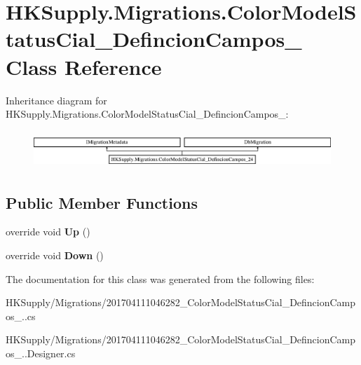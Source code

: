 \hypertarget{class_h_k_supply_1_1_migrations_1_1_color_model_status_cial___defincion_campos__24}{}\section{H\+K\+Supply.\+Migrations.\+Color\+Model\+Status\+Cial\+\_\+\+Defincion\+Campos\+\_ Class Reference}
\label{class_h_k_supply_1_1_migrations_1_1_color_model_status_cial___defincion_campos__24}
Inheritance diagram for H\+K\+Supply.\+Migrations.\+Color\+Model\+Status\+Cial\+\_\+\+Defincion\+Campos\+\_\+:\begin{figure}[H]
\begin{center}
\leavevmode
\includegraphics[height=1.428571cm]{class_h_k_supply_1_1_migrations_1_1_color_model_status_cial___defincion_campos__24}
\end{center}
\end{figure}
\subsection*{Public Member Functions}
\begin{DoxyCompactItemize}
\item 
\mbox{\label{class_h_k_supply_1_1_migrations_1_1_color_model_status_cial___defincion_campos__24_a64a34fcb6380d4e9bd6f73a98037b203}} 
override void {\bfseries Up} ()
\item 
\mbox{\label{class_h_k_supply_1_1_migrations_1_1_color_model_status_cial___defincion_campos__24_a40a65d9a5d6cc884de375ef06736c5fe}} 
override void {\bfseries Down} ()
\end{DoxyCompactItemize}


The documentation for this class was generated from the following files\+:\begin{DoxyCompactItemize}
\item 
H\+K\+Supply/\+Migrations/201704111046282\+\_\+\+Color\+Model\+Status\+Cial\+\_\+\+Defincion\+Campos\+\_..\+cs\item 
H\+K\+Supply/\+Migrations/201704111046282\+\_\+\+Color\+Model\+Status\+Cial\+\_\+\+Defincion\+Campos\+\_..\+Designer.\+cs\end{DoxyCompactItemize}
